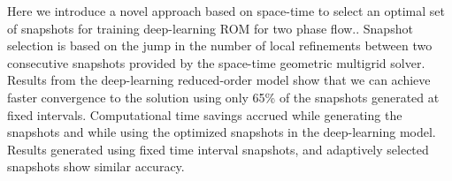 \begin{addmargin}[2em]{0em}
{Here we introduce a novel approach based on space-time to select an optimal set of snapshots for training  deep-learning ROM for two phase flow.. Snapshot selection is based on the jump in the number of local refinements between two consecutive snapshots provided by the space-time  geometric multigrid solver. Results from the deep-learning reduced-order model show that we can achieve faster convergence to the solution using only 65\% of the snapshots generated at fixed intervals. Computational time savings accrued while generating the snapshots and while using the optimized snapshots in the deep-learning model. Results generated using fixed time interval snapshots, and adaptively selected snapshots show similar accuracy.}





\end{addmargin}
